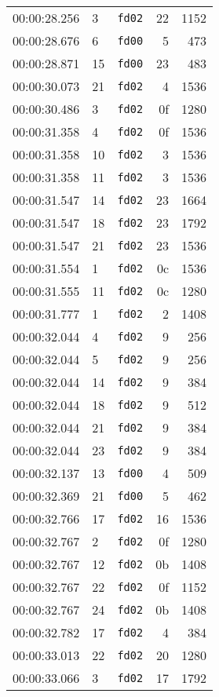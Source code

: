 \documentclass{article}
\begin{document}
\begin{longtable}{lllrr}
00:00:28.256 & 3 & \texttt{fd02} & 22 & 1152 \\
00:00:28.676 & 6 & \texttt{fd00} & 5 & 473 \\
00:00:28.871 & 15 & \texttt{fd00} & 23 & 483 \\
00:00:30.073 & 21 & \texttt{fd02} & 4 & 1536 \\
00:00:30.486 & 3 & \texttt{fd02} & 0f & 1280 \\
00:00:31.358 & 4 & \texttt{fd02} & 0f & 1536 \\
00:00:31.358 & 10 & \texttt{fd02} & 3 & 1536 \\
00:00:31.358 & 11 & \texttt{fd02} & 3 & 1536 \\
00:00:31.547 & 14 & \texttt{fd02} & 23 & 1664 \\
00:00:31.547 & 18 & \texttt{fd02} & 23 & 1792 \\
00:00:31.547 & 21 & \texttt{fd02} & 23 & 1536 \\
00:00:31.554 & 1 & \texttt{fd02} & 0c & 1536 \\
00:00:31.555 & 11 & \texttt{fd02} & 0c & 1280 \\
00:00:31.777 & 1 & \texttt{fd02} & 2 & 1408 \\
00:00:32.044 & 4 & \texttt{fd02} & 9 & 256 \\
00:00:32.044 & 5 & \texttt{fd02} & 9 & 256 \\
00:00:32.044 & 14 & \texttt{fd02} & 9 & 384 \\
00:00:32.044 & 18 & \texttt{fd02} & 9 & 512 \\
00:00:32.044 & 21 & \texttt{fd02} & 9 & 384 \\
00:00:32.044 & 23 & \texttt{fd02} & 9 & 384 \\
00:00:32.137 & 13 & \texttt{fd00} & 4 & 509 \\
00:00:32.369 & 21 & \texttt{fd00} & 5 & 462 \\
00:00:32.766 & 17 & \texttt{fd02} & 16 & 1536 \\
00:00:32.767 & 2 & \texttt{fd02} & 0f & 1280 \\
00:00:32.767 & 12 & \texttt{fd02} & 0b & 1408 \\
00:00:32.767 & 22 & \texttt{fd02} & 0f & 1152 \\
00:00:32.767 & 24 & \texttt{fd02} & 0b & 1408 \\
00:00:32.782 & 17 & \texttt{fd02} & 4 & 384 \\
00:00:33.013 & 22 & \texttt{fd02} & 20 & 1280 \\
00:00:33.066 & 3 & \texttt{fd02} & 17 & 1792 \\

\end{longtable}
\end{document}
